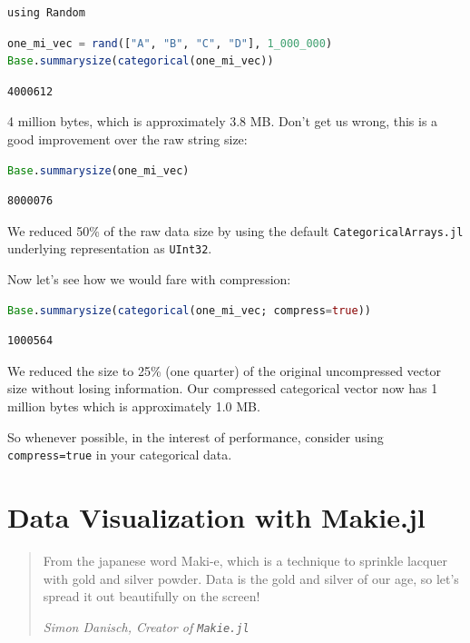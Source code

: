 \documentclass[
  notoc %
]{tufte-book}
\newcommand{\passthrough}[1]{#1}
\begin{document}
\begin{lstlisting}
using Random
\end{lstlisting}

\begin{lstlisting}[language=Julia]
one_mi_vec = rand(["A", "B", "C", "D"], 1_000_000)
Base.summarysize(categorical(one_mi_vec))
\end{lstlisting}

\begin{lstlisting}
4000612
\end{lstlisting}

4 million bytes, which is approximately 3.8 MB. Don't get us wrong, this
is a good improvement over the raw string size:

\begin{lstlisting}[language=Julia]
Base.summarysize(one_mi_vec)
\end{lstlisting}

\begin{lstlisting}
8000076
\end{lstlisting}

We reduced 50\% of the raw data size by using the default
\passthrough{\lstinline!CategoricalArrays.jl!} underlying representation
as \passthrough{\lstinline!UInt32!}.

Now let's see how we would fare with compression:

\begin{lstlisting}[language=Julia]
Base.summarysize(categorical(one_mi_vec; compress=true))
\end{lstlisting}

\begin{lstlisting}
1000564
\end{lstlisting}

We reduced the size to 25\% (one quarter) of the original uncompressed
vector size without losing information. Our compressed categorical
vector now has 1 million bytes which is approximately 1.0 MB.

So whenever possible, in the interest of performance, consider using
\passthrough{\lstinline!compress=true!} in your categorical data.

\hypertarget{sec:DataVisualizationMakie}{%
\chapter{Data Visualization with
Makie.jl}\label{sec:DataVisualizationMakie}}

\begin{quote}
From the japanese word Maki-e, which is a technique to sprinkle lacquer
with gold and silver powder. Data is the gold and silver of our age, so
let's spread it out beautifully on the screen!

\emph{Simon Danisch, Creator of \passthrough{\lstinline!Makie.jl!}}
\end{quote}
\end{document}
